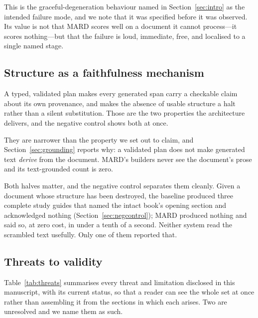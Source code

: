 \documentclass[conference]{IEEEtran}
\begin{document}
This is the graceful-degeneration behaviour named in
Section~\ref{sec:intro} as the intended failure mode, and we note that it was
specified before it was observed. Its value is not that MARD scores well on a
document it cannot process---it scores nothing---but that the failure is
loud, immediate, free, and localised to a single named stage.

\subsection{Structure as a faithfulness mechanism}
A typed, validated plan makes every generated span carry a checkable claim
about its own provenance, and makes the absence of usable structure a halt
rather than a silent substitution. Those are the two properties the
architecture delivers, and the negative control shows both at once.

They are narrower than the property we set out to claim, and
Section~\ref{sec:grounding} reports why: a validated plan does not make
generated text \emph{derive} from the document. MARD's builders never see the
document's prose and its text-grounded count is zero.

Both halves matter, and the negative control separates them cleanly. Given a
document whose structure has been destroyed, the baseline produced three
complete study guides that named the intact book's opening section and
acknowledged nothing (Section~\ref{sec:negcontrol}); MARD produced nothing and
said so, at zero cost, in under a tenth of a second. Neither system read the
scrambled text usefully. Only one of them reported that.

\subsection{Threats to validity}
\label{sec:threats}
Table~\ref{tab:threats} summarises every threat and limitation disclosed in
this manuscript, with its current status, so that a reader can see the whole
set at once rather than assembling it from the sections in which each arises.
Two are unresolved and we name them as such.
\end{document}
